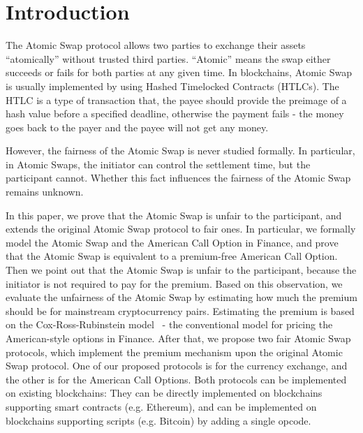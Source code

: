 \section{Introduction}
\label{sec:intro}

The Atomic Swap protocol allows two parties to exchange their assets ``atomically'' without trusted third parties.
``Atomic'' means the swap either succeeds or fails for both parties at any given time.
In blockchains, Atomic Swap is usually implemented by using Hashed Timelocked Contracts (HTLCs).
The HTLC is a type of transaction that, the payee should provide the preimage of a hash value before a specified deadline, otherwise the payment fails - the money goes back to the payer and the payee will not get any money.

However, the fairness of the Atomic Swap is never studied formally.
In particular, in Atomic Swaps, the initiator can control the settlement time, but the participant cannot.
Whether this fact influences the fairness of the Atomic Swap remains unknown.

In this paper, we prove that the Atomic Swap is unfair to the participant, and extends the original Atomic Swap protocol to fair ones.
In particular, we formally model the Atomic Swap and the American Call Option in Finance,
and prove that the Atomic Swap is equivalent to a premium-free American Call Option.
Then we point out that the Atomic Swap is unfair to the participant, because the initiator is not required to pay for the premium.
Based on this observation, we evaluate the unfairness of the Atomic Swap by estimating how much the premium should be for mainstream cryptocurrency pairs.
Estimating the premium is based on the Cox-Ross-Rubinstein model~\cite{cox1979option} - the conventional model for pricing the American-style options in Finance.
After that, we propose two fair Atomic Swap protocols, which implement the premium mechanism upon the original Atomic Swap protocol.
One of our proposed protocols is for the currency exchange, and the other is for the American Call Options.
Both protocols can be implemented on existing blockchains: 
They can be directly implemented on blockchains supporting smart contracts (e.g. Ethereum),
and can be implemented on blockchains supporting scripts (e.g. Bitcoin) by adding a single opcode.

